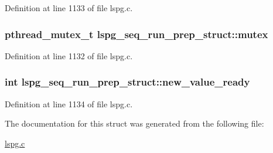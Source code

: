 Definition at line 1133 of file lspg.\-c.

\hypertarget{structlspg__seq__run__prep__struct_ad146cb91b5f7dd8bb283092c28781fe7}{
\subsubsection[{mutex}]{\setlength{\rightskip}{0pt plus 5cm}pthread\-\_\-mutex\-\_\-t lspg\-\_\-seq\-\_\-run\-\_\-prep\-\_\-struct\-::mutex}}\label{structlspg__seq__run__prep__struct_ad146cb91b5f7dd8bb283092c28781fe7}


Definition at line 1132 of file lspg.\-c.

\hypertarget{structlspg__seq__run__prep__struct_a42d08888327e9059ddd69ddfec31b8a9}{
\subsubsection[{new\-\_\-value\-\_\-ready}]{\setlength{\rightskip}{0pt plus 5cm}int lspg\-\_\-seq\-\_\-run\-\_\-prep\-\_\-struct\-::new\-\_\-value\-\_\-ready}}\label{structlspg__seq__run__prep__struct_a42d08888327e9059ddd69ddfec31b8a9}


Definition at line 1134 of file lspg.\-c.



The documentation for this struct was generated from the following file\-:\begin{DoxyCompactItemize}
\item 
\hyperlink{lspg_8c}{lspg.\-c}\end{DoxyCompactItemize}
